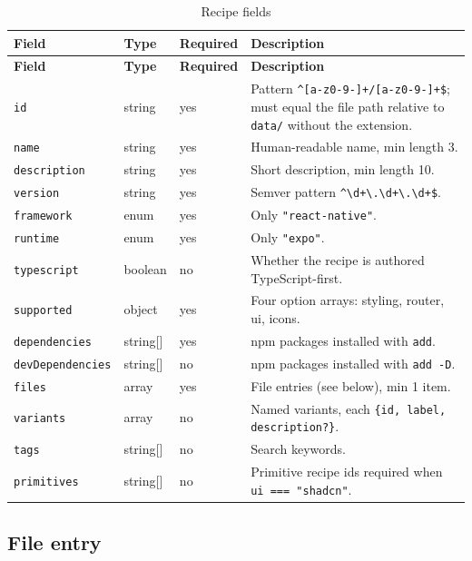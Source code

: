 \begin{longtable}{@{}L{2.7cm}L{2.1cm}L{2cm}L{7.2cm}@{}}
\caption{Recipe fields}\\
\toprule
\textbf{Field} & \textbf{Type} & \textbf{Required} & \textbf{Description} \\
\midrule
\endfirsthead
\toprule
\textbf{Field} & \textbf{Type} & \textbf{Required} & \textbf{Description} \\
\midrule
\endhead
\texttt{id} & string & yes & Pattern \texttt{\^{}[a-z0-9-]+/[a-z0-9-]+\$}; must equal the
file path relative to \texttt{data/} without the extension. \\
\texttt{name} & string & yes & Human-readable name, min length 3. \\
\texttt{description} & string & yes & Short description, min length 10. \\
\texttt{version} & string & yes & Semver pattern \texttt{\^{}\textbackslash d+\textbackslash.\textbackslash d+\textbackslash.\textbackslash d+\$}. \\
\texttt{framework} & enum & yes & Only \texttt{"react-native"}. \\
\texttt{runtime} & enum & yes & Only \texttt{"expo"}. \\
\texttt{typescript} & boolean & no & Whether the recipe is authored TypeScript-first. \\
\texttt{supported} & object & yes & Four option arrays: styling, router, ui, icons. \\
\texttt{dependencies} & string[] & yes & npm packages installed with \texttt{add}. \\
\texttt{devDependencies} & string[] & no & npm packages installed with \texttt{add -D}. \\
\texttt{files} & array & yes & File entries (see below), min 1 item. \\
\texttt{variants} & array & no & Named variants, each \texttt{\{id, label, description?\}}. \\
\texttt{tags} & string[] & no & Search keywords. \\
\texttt{primitives} & string[] & no & Primitive recipe ids required when
\texttt{ui === "shadcn"}. \\
\bottomrule
\end{longtable}

\subsection*{File entry}

